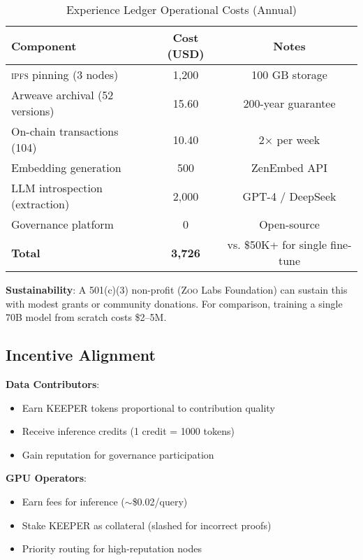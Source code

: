 \documentclass[11pt,letterpaper]{article}
\newcommand{\Zoo}{\textsc{Zoo}}
\newcommand{\IPFS}{\textsc{ipfs}}
\begin{document}
\begin{table}[t]
\centering
\caption{Experience Ledger Operational Costs (Annual)}
\label{tab:costs}
\begin{tabular}{lcc}
\toprule
\textbf{Component} & \textbf{Cost (USD)} & \textbf{Notes} \\
\midrule
\IPFS{} pinning (3 nodes) & 1,200 & 100 GB storage \\
Arweave archival (52 versions) & 15.60 & 200-year guarantee \\
On-chain transactions (104) & 10.40 & 2× per week \\
Embedding generation & 500 & ZenEmbed API \\
LLM introspection (extraction) & 2,000 & GPT-4 / DeepSeek \\
Governance platform & 0 & Open-source \\
\midrule
\textbf{Total} & \textbf{3,726} & \multirow{2}{*}{vs. \$50K+ for single fine-tune} \\
\bottomrule
\end{tabular}
\end{table}

\textbf{Sustainability}: A 501(c)(3) non-profit (\Zoo{} Labs Foundation) can sustain this with modest grants or community donations. For comparison, training a single 70B model from scratch costs \$2--5M.

\subsection{Incentive Alignment}

\textbf{Data Contributors}:
\begin{itemize}
    \item Earn KEEPER tokens proportional to contribution quality
    \item Receive inference credits (1 credit = 1000 tokens)
    \item Gain reputation for governance participation
\end{itemize}

\textbf{GPU Operators}:
\begin{itemize}
    \item Earn fees for inference ($\sim$\$0.02/query)
    \item Stake KEEPER as collateral (slashed for incorrect proofs)
    \item Priority routing for high-reputation nodes
\end{itemize}
\end{document}
